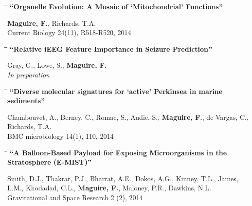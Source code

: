 \documentclass{res}
\begin{document}
\begin{resume}
\vspace{-0.2in}
\begin{tabbing}
   \hspace{2.3in}\= \hspace{2.6in}\= \kill
   {\bf ``Organelle Evolution: A Mosaic of `Mitochondrial' Functions''} 
   \end{tabbing}\vspace{-20pt}
   \textbf{Maguire, F.}, Richards, T.A.\\ 
    Current Biology 24(11), R518-R520, 2014\\

\vspace{-0.2in}

\begin{tabbing}
   \hspace{2.3in}\= \hspace{2.6in}\= \kill
   {\bf ``Relative iEEG Feature Importance in Seizure Prediction''} 
   \end{tabbing}\vspace{-20pt}
   Gray, G., Lowe, S., \textbf{Maguire, F.}\\ 
    \textit{In preparation}\\
\vspace{-0.2in}

\begin{tabbing}
   \hspace{2.3in}\= \hspace{2.6in}\= \kill
   {\bf ``Diverse molecular signatures for `active' Perkinsea in marine sediments''} 
   \end{tabbing}\vspace{-20pt}
   Chambouvet, A., Berney, C., Romac, S., Audic, S., \textbf{Maguire, F.}, de Vargas, C., Richards, T.A.\\
     BMC microbiology 14(1), 110, 2014\\

\vspace{-0.2in}
\begin{tabbing}
   \hspace{2.3in}\= \hspace{2.6in}\= \kill
   {\bf ``A Balloon-Based Payload for Exposing Microorganisms in the Stratosphere (E-MIST)''}
   \end{tabbing}\vspace{-20pt}
   Smith, D.J., Thakrar, P.J., Bharrat, A.E., Dokos, A.G., Kinney, T.L., James, L.M., Khodadad, C.L., \textbf{Maguire, F.}, Maloney, P.R., Dawkins, N.L.\\
Gravitational and Space Research 2 (2), 2014\\


\end{resume}
\end{document}
